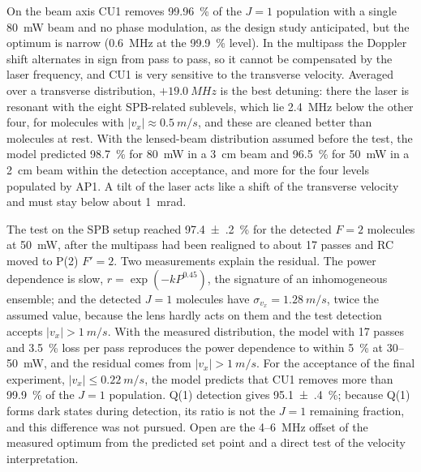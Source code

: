 \documentclass[11pt,a4paper,oneside]{report}
\begin{document}
On the beam axis CU1 removes \SI{99.96}{\percent} of the $J=1$ population with a single
\SI{80}{mW} beam and no phase modulation, as the design study anticipated, but the optimum is narrow
(\SI{0.6}{MHz} at the \SI{99.9}{\percent} level). In the multipass the Doppler shift alternates in
sign from pass to pass, so it cannot be compensated by the laser frequency, and CU1 is very sensitive
to the transverse velocity. Averaged over a transverse distribution, $+\SI{19.0}{MHz}$ is the best
detuning: there the laser is resonant with the eight SPB-related sublevels, which lie
\SI{2.4}{MHz} below the other four, for molecules with $|v_x|\approx\SI{0.5}{m/s}$, and these are
cleaned better than molecules at rest. With the lensed-beam distribution assumed before the test, the
model predicted \SI{98.7}{\percent} for \SI{80}{mW} in a \SI{3}{cm} beam and \SI{96.5}{\percent} for
\SI{50}{mW} in a \SI{2}{cm} beam within the detection acceptance, and more for the four levels
populated by AP1. A tilt of the laser acts like a shift of the transverse velocity and must stay
below about \SI{1}{mrad}.

The test on the SPB setup reached \SI{97.4(2)}{\percent} for the detected $F=2$ molecules at
\SI{50}{mW}, after the multipass had been realigned to about 17 passes and RC moved to P(2) $F'=2$.
Two measurements explain the residual. The power dependence is slow, $r=\exp(-kP^{0.45})$, the
signature of an inhomogeneous ensemble; and the detected $J=1$ molecules have
$\sigma_{v_x}=\SI{1.28}{m/s}$, twice the assumed value, because the lens hardly acts on them and the
test detection accepts $|v_x|>\SI{1}{m/s}$. With the measured distribution, the model with 17 passes
and \SI{3.5}{\percent} loss per pass reproduces the power dependence to within \SI{5}{\percent} at
30--\SI{50}{mW}, and the residual comes from $|v_x|>\SI{1}{m/s}$. For the acceptance of the final
experiment, $|v_x|\leq\SI{0.22}{m/s}$, the model predicts that CU1 removes more than
\SI{99.9}{\percent} of the $J=1$ population. Q(1) detection gives \SI{95.1(4)}{\percent}; because Q(1)
forms dark states during detection, its ratio is not the $J=1$ remaining fraction, and this
difference was not pursued. Open are the 4--\SI{6}{MHz} offset of the measured optimum from the
predicted set point and a direct test of the velocity interpretation.
\end{document}
